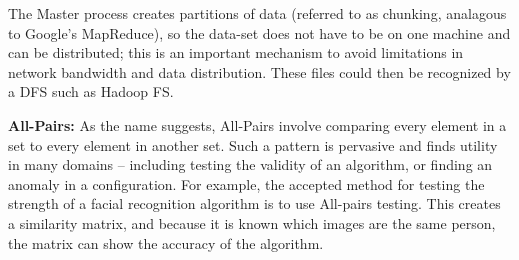 \documentclass[conference,final]{IEEEtran}
\newcommand{\michaelnote}[1]{ {\textcolor{blue} { ***MM: #1 }}}
\newcommand{\michaelnote}[1]{ {\textcolor{blue} { ***MM: #1 }}}
\begin{document}
The Master process creates partitions of data (referred to as
chunking, analagous to Google's MapReduce), so the data-set does not
have to be on one machine and can be distributed; this is an important
mechanism to avoid limitations in network bandwidth and data
distribution.  These files could then be recognized by a DFS such as
Hadoop FS.





{\bf All-Pairs: } As the name suggests, All-Pairs involve comparing
every element in a set to every element in another set.  Such a
pattern is pervasive and finds utility in many domains -- including
testing the validity of an algorithm, or finding an anomaly in a
configuration.  For example, the accepted method for testing the
strength of a facial recognition algorithm is to use All-pairs
testing.  This creates a similarity matrix, and because it is known
which images are the same person, the matrix can show the accuracy of
the algorithm.
\end{document}
